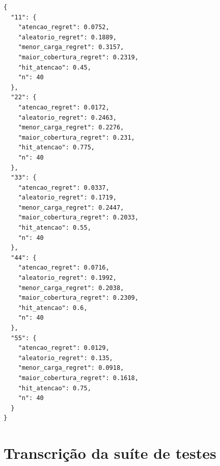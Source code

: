 \documentclass[12pt,openany,oneside,a4paper,brazil,chapter=TITLE]{abntex2}
\begin{document}
\begin{lstlisting}
{
  "11": {
    "atencao_regret": 0.0752,
    "aleatorio_regret": 0.1889,
    "menor_carga_regret": 0.3157,
    "maior_cobertura_regret": 0.2319,
    "hit_atencao": 0.45,
    "n": 40
  },
  "22": {
    "atencao_regret": 0.0172,
    "aleatorio_regret": 0.2463,
    "menor_carga_regret": 0.2276,
    "maior_cobertura_regret": 0.231,
    "hit_atencao": 0.775,
    "n": 40
  },
  "33": {
    "atencao_regret": 0.0337,
    "aleatorio_regret": 0.1719,
    "menor_carga_regret": 0.2447,
    "maior_cobertura_regret": 0.2033,
    "hit_atencao": 0.55,
    "n": 40
  },
  "44": {
    "atencao_regret": 0.0716,
    "aleatorio_regret": 0.1992,
    "menor_carga_regret": 0.2038,
    "maior_cobertura_regret": 0.2309,
    "hit_atencao": 0.6,
    "n": 40
  },
  "55": {
    "atencao_regret": 0.0129,
    "aleatorio_regret": 0.135,
    "menor_carga_regret": 0.0918,
    "maior_cobertura_regret": 0.1618,
    "hit_atencao": 0.75,
    "n": 40
  }
}
\end{lstlisting}

\chapter{Transcrição da suíte de testes}
\label{ap:testes}
\end{document}
